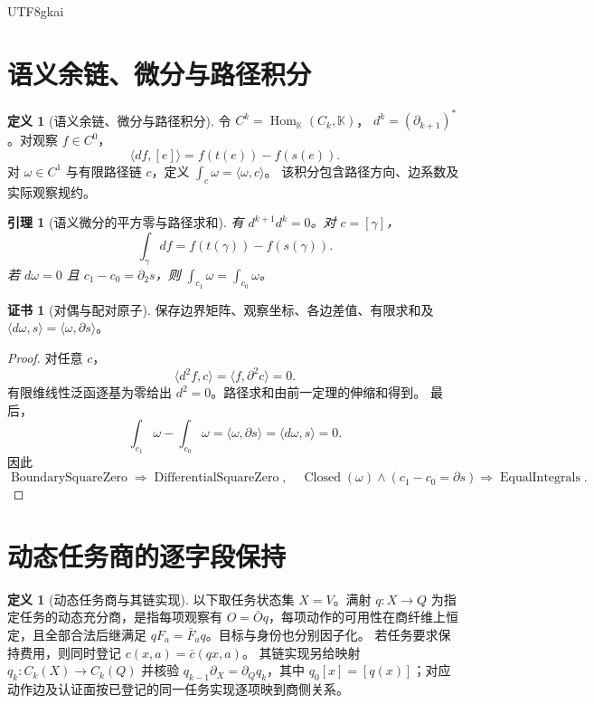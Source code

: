 \documentclass[12pt,a4paper,openany,notitlepage]{report}
\theoremstyle{plain}
\newtheorem{lemma}[theorem]{引理}
\theoremstyle{definition}
\newtheorem{definition}[theorem]{定义}
\newtheorem*{certificate}{证书}
\theoremstyle{remark}
\begin{document}
\begin{CJK*}{UTF8}{gkai}
\section{语义余链、微分与路径积分}

\begin{definition}[语义余链、微分与路径积分]
\label{hgov:def:semanticdiff}
令 $C^k=\operatorname{Hom}_{\mathbb K}(C_k,\mathbb K)$，
$d^k=(\partial_{k+1})^*$。对观察 $f\in C^0$，
\[
\langle df,[e]\rangle=f(t(e))-f(s(e)).
\]
对 $\omega\in C^1$ 与有限路径链 $c$，定义
$\int_c\omega=\langle\omega,c\rangle$。
该积分包含路径方向、边系数及实际观察规约。
\end{definition}

\begin{lemma}[语义微分的平方零与路径求和]
\label{hgov:lem:semanticdiff}
有 $d^{k+1}d^k=0$。对 $c=[\gamma]$，
\[
\int_\gamma df=f(t(\gamma))-f(s(\gamma)).
\]
若 $d\omega=0$ 且 $c_1-c_0=\partial_2s$，则
$\int_{c_1}\omega=\int_{c_0}\omega$。
\end{lemma}
\begin{certificate}[对偶与配对原子]
保存边界矩阵、观察坐标、各边差值、有限求和及
$\langle d\omega,s\rangle=\langle\omega,\partial s\rangle$。
\end{certificate}
\begin{proof}
对任意 $c$，
\[
\langle d^2f,c\rangle=\langle f,\partial^2c\rangle=0.
\]
有限维线性泛函逐基为零给出 $d^2=0$。路径求和由前一定理的伸缩和得到。
最后，
\[
\int_{c_1}\omega-\int_{c_0}\omega
=\langle\omega,\partial s\rangle
=\langle d\omega,s\rangle=0.
\]
因此
\[
\operatorname{BoundarySquareZero}\Rightarrow\operatorname{DifferentialSquareZero},
\quad
\operatorname{Closed}(\omega)\land(c_1-c_0=\partial s)
\Rightarrow\operatorname{EqualIntegrals}.
\]
\end{proof}

\section{动态任务商的逐字段保持}

\begin{definition}[动态任务商与其链实现]
\label{hgov:def:quotient}
以下取任务状态集 $X=V$。满射 $q:X\to Q$ 为指定任务的动态充分商，是指每项观察有
$O=\bar Oq$，每项动作的可用性在商纤维上恒定，且全部合法后继满足
$qF_a=\bar F_aq$。目标与身份也分别因子化。
若任务要求保持费用，则同时登记 $c(x,a)=\bar c(qx,a)$。
其链实现另给映射 $q_k:C_k(X)\to C_k(Q)$ 并核验
$q_{k-1}\partial_X=\partial_Qq_k$，其中
$q_0[x]=[q(x)]$；对应动作边及认证面按已登记的同一任务实现逐项映到商侧关系。
\end{definition}


\end{CJK*}
\end{document}
